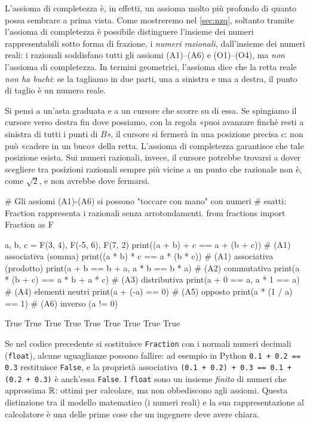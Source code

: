 L'assioma di completezza è, in effetti, un assioma molto più profondo di quanto possa
sembrare a prima vista. Come mostreremo nel \cref{sec:nzq}, soltanto tramite l'assioma di
completezza è possibile distinguere l'insieme dei numeri rappresentabili sotto forma di
frazione, i \emph{numeri razionali}, dall'insieme dei numeri reali: i razionali
soddisfano tutti gli assiomi (A1)--(A6) e (O1)--(O4), ma \emph{non} l'assioma di
completezza. In termini geometrici, l'assioma dice che la retta reale \emph{non ha
buchi}: se la tagliamo in due parti, una a sinistra e una a destra, il punto di taglio
è un numero reale.

\begin{idea}
Si pensi a un'asta graduata e a un cursore che scorre su di essa. Se spingiamo il
cursore verso destra fin dove possiamo, con la regola «puoi avanzare finché resti a
sinistra di tutti i punti di $B$», il cursore si fermerà in una posizione precisa $c$:
non può «cadere in un buco» della retta. L'assioma di completezza garantisce che tale
posizione esista. Sui numeri razionali, invece, il cursore potrebbe trovarsi a dover
scegliere tra posizioni razionali sempre più vicine a un punto che razionale non è,
come $\sqrt2$, e non avrebbe dove fermarsi.
\end{idea}

\begin{python}
# Gli assiomi (A1)-(A6) si possono "toccare con mano" con numeri
# esatti: Fraction rappresenta i razionali senza arrotondamenti.
from fractions import Fraction as F

a, b, c = F(3, 4), F(-5, 6), F(7, 2)
print((a + b) + c == a + (b + c))      # (A1) associativa (somma)
print((a * b) * c == a * (b * c))      # (A1) associativa (prodotto)
print(a + b == b + a, a * b == b * a)  # (A2) commutativa
print(a * (b + c) == a * b + a * c)    # (A3) distributiva
print(a + 0 == a, a * 1 == a)          # (A4) elementi neutri
print(a + (-a) == 0)                   # (A5) opposto
print(a * (1 / a) == 1)                # (A6) inverso (a != 0)
\end{python}
\begin{risultato}
True
True
True True
True
True True
True
True
\end{risultato}

\begin{attenzione}
Se nel codice precedente si sostituisce \texttt{Fraction} con i normali numeri
decimali (\texttt{float}), alcune uguaglianze possono fallire: ad esempio in Python
\texttt{0.1 + 0.2 == 0.3} restituisce \texttt{False}, e la proprietà associativa
\texttt{(0.1 + 0.2) + 0.3 == 0.1 + (0.2 + 0.3)} è anch'essa \texttt{False}. I
\texttt{float} sono un insieme \emph{finito} di numeri che approssima $\mathbb{R}$: ottimi per
calcolare, ma non obbediscono agli assiomi. Questa distinzione tra il modello matematico
(i numeri reali) e la sua rappresentazione al calcolatore è una delle prime cose che un
ingegnere deve avere chiara.
\end{attenzione}
